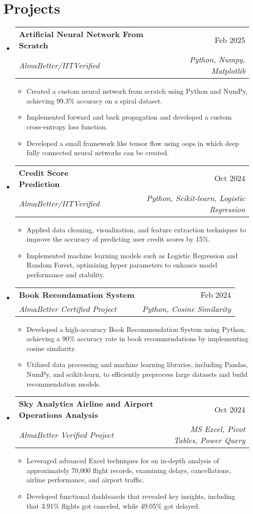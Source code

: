 \documentclass[letterpaper,10pt]{article}
\makeatletter
\newcommand{\resumeItem}[1]{\item\small{#1}}
\newcommand{\resumeSubheading}[4]{%
\vspace{-1pt}\item
  \begin{tabular*}{0.97\textwidth}[t]{l@{\extracolsep{\fill}}r}
    \textbf{#1} & #2 \\
    \textit{#3} & \textit{#4} \\
  \end{tabular*}\vspace{-7pt}
}
\newcommand{\resumeSubHeadingList}{\begin{itemize}[leftmargin=0.15in, label={}]}
\newcommand{\resumeSubHeadingListEnd}{\end{itemize}}
\makeatother
\begin{document}
\section{Projects}
\resumeSubHeadingList
  \resumeSubheading
      {Artificial Neural Network From Scratch}{Feb 2025}
      {AlmaBetter/IITVerified}{Python, Numpy, Matplotlib}
      \resumeSubHeadingList
          \resumeItem{\textbullet Created a custom neural network from scratch using Python and NumPy, achieving 99.3\% accuracy on a spiral dataset.}
          \resumeItem{\textbullet Implemented forward and back propagation and developed a custom cross-entropy loss function.}
          \resumeItem{\textbullet Developed a small framework like tensor flow using oops in which deep fully connected neural networks can be created.}
      \resumeSubHeadingListEnd
  \resumeSubheading
      {Credit Score Prediction}{Oct 2024}
      {AlmaBetter/IITVerified}{Python, Scikit-learn, Logistic Regression}
      \resumeSubHeadingList
          \resumeItem{\textbullet Applied data cleaning, visualization, and feature extraction techniques to improve the accuracy of predicting user credit scores by 15\%.}
          \resumeItem{\textbullet Implemented machine learning models such as Logistic Regression and Random Forest, optimizing hyper parameters to enhance model performance and stability.}
      \resumeSubHeadingListEnd
   \resumeSubheading
      {Book Recondamation System}{Feb 2024}
      {AlmaBetter Certified Project}{Python, Cosine Similarity}
      \resumeSubHeadingList
          \resumeItem{\textbullet Developed a high-accuracy Book Recommendation System using Python, achieving a 90\% accuracy rate in book recommendations by implementing cosine similarity.}
          \resumeItem{\textbullet Utilized data processing and machine learning libraries, including Pandas, NumPy, and scikit-learn, to efficiently preprocess large datasets and build recommendation models.}
      \resumeSubHeadingListEnd
  \resumeSubheading
      {Sky Analytics Airline and Airport Operations Analysis}{Oct 2024}
      {AlmaBetter Verified Project}{MS Excel, Pivot Tables, Power Query}
      \resumeSubHeadingList
          \resumeItem{\textbullet Leveraged advanced Excel techniques for an in-depth analysis of approximately 70,000 flight records, examining delays, cancellations, airline performance, and airport traffic.}
          \resumeItem{\textbullet Developed functional dashboards that revealed key insights, including that 3.91\% flights got canceled, while 49.05\% got delayed.}
      \resumeSubHeadingListEnd
\resumeSubHeadingListEnd
\end{document}
